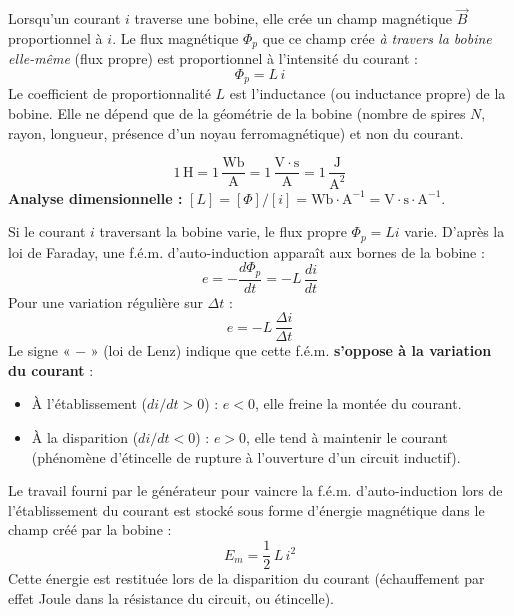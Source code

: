 \documentclass[11pt]{article}
\newcommand{\cle}[1]{{\popxbold\color{popdark}#1}}
\newcounter{popsec}
\newcounter{popsub}
\newcommand{\courssub}[1]{%
  \stepcounter{popsub}%
  \par\vspace{9pt}\noindent{\popxbold\fontsize{11.5}{13}\selectfont\color{popink}{\color{poporange}\thepopsec.\thepopsub}\hspace{6pt}#1}\par\nopagebreak\vspace{4pt}
}
\begin{document}
\courssub{Auto-induction et inductance}

\begin{definition}
Lorsqu'un courant $i$ traverse une bobine, elle crée un champ magnétique $\vec{B}$ proportionnel à $i$. Le flux magnétique $\Phi_p$ que ce champ crée \emph{à travers la bobine elle-même} (flux propre) est proportionnel à l'intensité du courant :
\[ \Phi_p = L\,i \]
Le coefficient de proportionnalité $L$ est l'\cle{inductance} (ou inductance propre) de la bobine. Elle ne dépend que de la géométrie de la bobine (nombre de spires $N$, rayon, longueur, présence d'un noyau ferromagnétique) et non du courant.
\end{definition}

\begin{propriete}
\[ 1\,\mathrm{H} = 1\,\dfrac{\mathrm{Wb}}{\mathrm{A}} = 1\,\dfrac{\mathrm{V}\cdot\mathrm{s}}{\mathrm{A}} = 1\,\dfrac{\mathrm{J}}{\mathrm{A}^2} \]
\textbf{Analyse dimensionnelle :} $[L] = [\Phi]/[i] = \mathrm{Wb}\cdot\mathrm{A}^{-1} = \mathrm{V}\cdot\mathrm{s}\cdot\mathrm{A}^{-1}$.
\end{propriete}

\begin{propriete}
Si le courant $i$ traversant la bobine varie, le flux propre $\Phi_p = Li$ varie. D'après la loi de Faraday, une f.é.m. d'\cle{auto-induction} apparaît aux bornes de la bobine :
\[ e = -\dfrac{d\Phi_p}{dt} = -L\,\dfrac{di}{dt} \]
Pour une variation régulière sur $\Delta t$ :
\[ e = -L\,\dfrac{\Delta i}{\Delta t} \]
Le signe « $-$ » (loi de Lenz) indique que cette f.é.m. \textbf{s'oppose à la variation du courant} :
\begin{itemize}
\item À l'établissement ($di/dt > 0$) : $e < 0$, elle freine la montée du courant.
\item À la disparition ($di/dt < 0$) : $e > 0$, elle tend à maintenir le courant (phénomène d'\cle{étincelle de rupture} à l'ouverture d'un circuit inductif).
\end{itemize}
\end{propriete}

\begin{propriete}
Le travail fourni par le générateur pour vaincre la f.é.m. d'auto-induction lors de l'établissement du courant est stocké sous forme d'énergie magnétique dans le champ créé par la bobine :
\[ E_m = \dfrac{1}{2}\,L\,i^2 \]
Cette énergie est restituée lors de la disparition du courant (échauffement par effet Joule dans la résistance du circuit, ou étincelle).
\end{propriete}
\end{document}
